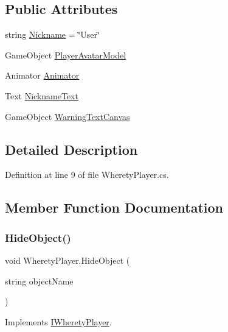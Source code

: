 \subsection*{Public Attributes}
\begin{DoxyCompactItemize}
\item 
string \mbox{\hyperlink{class_wherety_player_a4b69223c4cecc70a0d2e26da921cf7b4}{Nickname}} = \char`\"{}User\char`\"{}
\item 
Game\+Object \mbox{\hyperlink{class_wherety_player_af04135914737331db79932a881d1a41f}{Player\+Avatar\+Model}}
\item 
Animator \mbox{\hyperlink{class_wherety_player_a06753b2e604bebeda7523f009f5259ca}{Animator}}
\item 
Text \mbox{\hyperlink{class_wherety_player_aeddcaa682986588d775b22ec44c35aa9}{Nickname\+Text}}
\item 
Game\+Object \mbox{\hyperlink{class_wherety_player_a36a7fb7e2dfe289e6fe451b0d0e35a0a}{Warning\+Text\+Canvas}}
\end{DoxyCompactItemize}


\subsection{Detailed Description}


Definition at line 9 of file Wherety\+Player.\+cs.



\subsection{Member Function Documentation}
\mbox{\label{class_wherety_player_a0b6974f0ad99de9dd1af2fb65f498264}} 
\subsubsection{\texorpdfstring{HideObject()}{HideObject()}}
{\footnotesize\ttfamily void Wherety\+Player.\+Hide\+Object (\begin{DoxyParamCaption}\item[{string}]{object\+Name }\end{DoxyParamCaption})}



Implements \mbox{\hyperlink{interface_i_wherety_player_a2cd247a5438cb6b3142046991f39352c}{I\+Wherety\+Player}}.



